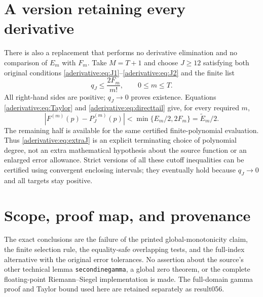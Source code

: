 \section{A version retaining every derivative}\label{aderivative:sec:all}
There is also a replacement that performs no derivative
elimination and no comparison of $E_m$ with $F_m$.
Take $M=T+1$ and choose $J\ge12$ satisfying both original
conditions \eqref{aderivative:eq:J1}--\eqref{aderivative:eq:J2} and the finite list
\begin{equation}\label{aderivative:eq:extraJ}
q_J\le\frac{2F_m}{m!},\qquad 0\le m\le T.
\end{equation}
All right-hand sides are positive; $q_J\to0$ proves
existence. Equations \eqref{aderivative:eq:Taylor} and
\eqref{aderivative:eq:directtail} give, for every required $m$,
\begin{equation}\label{aderivative:eq:halfall}
|F^{(m)}(p)-P_J^{(m)}(p)|
<\min\{E_m/2,2F_m\}=\widetilde E_m/2.
\end{equation}
The remaining half is available for the same certified
finite-polynomial evaluation. Thus \eqref{aderivative:eq:extraJ}
is an explicit terminating choice of polynomial degree,
not an extra mathematical hypothesis about the source
function or an enlarged error allowance. Strict versions
of all these cutoff inequalities can be certified using
convergent enclosing intervals; they eventually hold
because $q_J\to0$ and all targets stay positive.

\section{Scope, proof map, and provenance}\label{aderivative:sec:scope}
The exact conclusions are the failure of the printed
global-monotonicity claim, the finite selection rule,
the equality-safe overlapping tests, and the full-index
alternative with the original error tolerances. No assertion
about the source's other technical lemma
\texttt{secondinegamma}, a global zero theorem, or the
complete floating-point Riemann--Siegel implementation is
made. The full-domain gamma proof and Taylor bound used
here are retained separately as result056.

